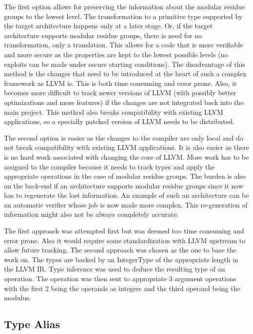 The first option allows for preserving the information about the
modular residue groups to the lowest level. The transformation to a
primitive type supported by the target architecture happens only at a
later stage. Or, if the target architecture supports modular residue
groups, there is need for no transformation, only a translation.  This
allows for a code that is more verifiable and more secure as the
properties are kept to the lowest possible levels (no exploits can be
made under secure starting conditions). The disadvantage of this
method is the changes that need to be introduced at the heart of such
a complex framework as LLVM is. This is both time consuming and error
prone. Also, it becomes more difficult to track newer versions of LLVM
(with possibly better optimizations and more features) if the changes
are not integrated back into the main project. This method also breaks
compatibility with existing LLVM applications, so a specially patched
version of LLVM needs to be distributed.

The second option is easier as the changes to the compiler are only
local and do not break compatibility with existing LLVM applications.
It is also easier as there is no hard work associated with changing
the core of LLVM. More work has to be assigned to the compiler because
it needs to track types and apply the appropriate operations in the
case of modular residue groups. The burden is also on the back-end if
an architecture supports modular residue groups since it now has to
regenerate the lost information. An example of such an architecture
can be an automatic verifier whose job is now made more complex. This
re-generation of information might also not be always completely
accurate.

The first approach was attempted first but was deemed too time
consuming and error prone. Also it would require some standardization
with LLVM upstream to allow future tracking. The second approach was
chosen as the one to base the work on. The types are backed by an
IntegerType of the appropriate length in the LLVM IR. Type inference
was used to deduce the resulting type of an operation. The operation
was then sent to appropriate 3 argument operations with the first 2
being the operands as integers and the third operand being the
modulus.

\subsection{Type Alias}

